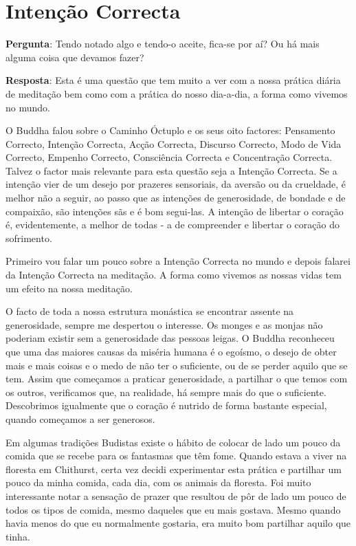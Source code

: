 \chapter{Intenção Correcta}

\textbf{Pergunta}: Tendo notado algo e tendo-o aceite, fica-se por aí?
Ou há mais alguma coisa que devamos fazer?

\textbf{Resposta}: Esta é uma questão que tem muito a ver com a nossa
prática diária de meditação bem como com a prática do nosso dia-a-dia, a
forma como vivemos no mundo.

O Buddha falou sobre o Caminho Óctuplo e os seus oito factores:
Pensamento Correcto, Intenção Correcta, Acção Correcta, Discurso
Correcto, Modo de Vida Correcto, Empenho Correcto, Consciência Correcta
e Concentração Correcta. Talvez o factor mais relevante para esta
questão seja a Intenção Correcta. Se a intenção vier de um desejo por
prazeres sensoriais, da aversão ou da crueldade, é melhor não a seguir,
ao passo que as intenções de generosidade, de bondade e de compaixão,
são intenções sãs e é bom segui-las. A intenção de libertar o coração é,
evidentemente, a melhor de todas - a de compreender e libertar o coração
do sofrimento.

Primeiro vou falar um pouco sobre a Intenção Correcta no mundo e depois
falarei da Intenção Correcta na meditação. A forma como vivemos as
nossas vidas tem um efeito na nossa meditação.

O facto de toda a nossa estrutura monástica se encontrar assente na
generosidade, sempre me despertou o interesse. Os monges e as monjas não
poderiam existir sem a generosidade das pessoas leigas. O Buddha
reconheceu que uma das maiores causas da miséria humana é o egoísmo, o
desejo de obter mais e mais coisas e o medo de não ter o suficiente, ou
de se perder aquilo que se tem. Assim que começamos a praticar
generosidade, a partilhar o que temos com os outros, verificamos que, na
realidade, há sempre mais do que o suficiente. Descobrimos igualmente
que o coração é nutrido de forma bastante especial, quando começamos a
ser generosos.

Em algumas tradições Budistas existe o hábito de colocar de lado um
pouco da comida que se recebe para os fantasmas que têm fome. Quando
estava a viver na floresta em Chithurst, certa vez decidi experimentar
esta prática e partilhar um pouco da minha comida, cada dia, com os
animais da floresta. Foi muito interessante notar a sensação de prazer
que resultou de pôr de lado um pouco de todos os tipos de comida, mesmo
daqueles que eu mais gostava. Mesmo quando havia menos do que eu
normalmente gostaria, era muito bom partilhar aquilo que tinha.

